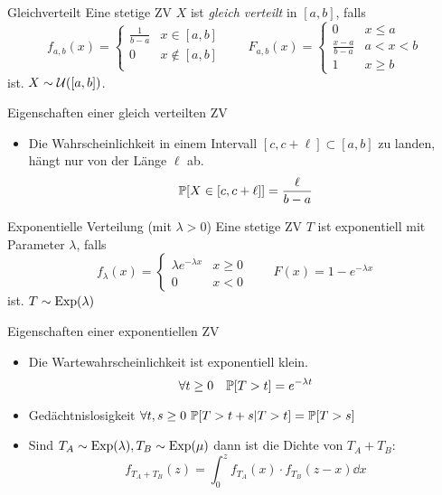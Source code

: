 \begin{definition}{Gleichverteilt}
	Eine stetige ZV $X$ ist \emph{gleich verteilt} in $[a,b]$, falls 
	\begin{equation*}
		f_{a,b} (x) = 
		\begin{cases}
			\frac{1}{b-a} & x \in [a,b]\\
			0 & x \notin [a,b]\\
		\end{cases}
		\qquad
		F_{a,b} (x) = 
		\begin{cases}
			0 & x \leq a\\
			\frac{x-a}{b-a} & a < x < b\\
			1 & x \geq b
		\end{cases}
	\end{equation*}
	ist. $X \sim \mathcal{U} ([a,b])$.
\end{definition}
Eigenschaften einer gleich verteilten ZV
\begin{itemize}
	\item Die Wahrscheinlichkeit in einem Intervall $[c,c + \ell] \subset [a,b]$ zu landen, hängt nur von der Länge
		$\ell$ ab.
		\begin{equation*}
			\mathbb{P} [X \in [c,c+\ell]] = \frac{\ell}{b-a} 
		\end{equation*}
\end{itemize}
\begin{definition}{Exponentielle Verteilung (mit $\lambda > 0$)}
	Eine stetige ZV $T$ ist exponentiell mit Parameter $\lambda$, falls 
	\begin{equation*}
		f_\lambda (x) = 
		\begin{cases}
			\lambda e^{-\lambda x} & x \geq 0\\
			0 & x < 0
		\end{cases}
		\qquad F (x) = 1 - e^{-\lambda x}
	\end{equation*}
	ist. $T \sim \text{Exp} (\lambda)$
\end{definition}
Eigenschaften einer exponentiellen ZV
\begin{itemize}
	\item Die Wartewahrscheinlichkeit ist exponentiell klein.
		\begin{equation*}
			\forall t \geq 0 \quad \mathbb{P} [T > t] = e^{-\lambda t}
		\end{equation*}
	\item Gedächtnislosigkeit $\forall t,s \geq 0 ~ \mathbb{P} [T > t+s | T > t] = \mathbb{P} [T > s]$
	\item Sind $T_A \sim \text{Exp}(\lambda), T_B \sim \text{Exp}(\mu)$ dann ist die Dichte von $T_A + T_B$:
		\begin{equation*}
			f_{T_A + T_B} (z) = \int_{0}^{z} f_{T_A}(x) \cdot f_{T_B} (z-x) \dd{x}
		\end{equation*}
\end{itemize}
